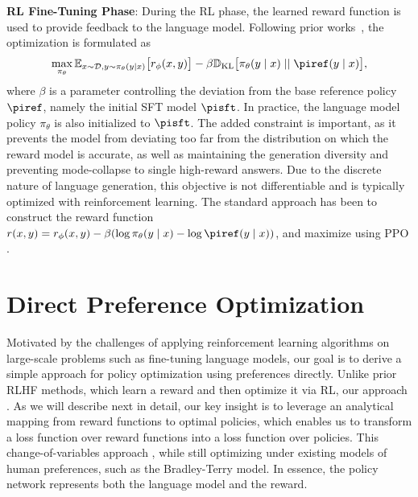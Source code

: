 \textbf{RL Fine-Tuning Phase}: During the RL phase, the learned reward function is used to provide feedback to the language model. Following prior works~\citep{jaques2017sequence, jaques2020human}, the optimization is formulated as
\begin{equation}\label{eq:RL}
\max_{\pi_{\theta}}  \mathbb{E}_{x\sim \mathcal{D}, y\sim \pi_{\theta}(y \mid x)}\bigl[r_{\phi}(x, y)\bigr] - \beta\mathbb{D}_{\textrm{KL}}\bigl[\pi_{\theta}(y\mid x)\mid \mid \piref(y\mid x)\bigr],
\end{equation}
where $\beta$ is a parameter controlling the deviation from the base reference policy $\piref$, namely the initial SFT model $\pisft$. 
In practice, the language model policy $\pi_\theta$ is also initialized to $\pisft$. The added constraint is important, as it prevents the model from deviating too far from the distribution on which the reward model is accurate, as well as maintaining the generation diversity and preventing mode-collapse to single high-reward answers. Due to the discrete nature of language generation, this objective is not differentiable and is typically optimized with reinforcement learning. The standard approach \citep{ziegler2020finetuning, stiennon2022learning, bai2022training, ouyang2022training} has been to construct the reward function ${r(x, y) = r_{\phi}(x, y) -\beta (\log \pi_{\theta}(y\mid x) - \log \piref(y\mid x))}$, and maximize using PPO \cite{schulman2017proximal}. 

\section{Direct Preference Optimization}\label{sec:DPO}

Motivated by the challenges of applying reinforcement learning algorithms on large-scale problems such as fine-tuning language models, our goal is to derive a simple approach for policy optimization using preferences directly. Unlike prior RLHF methods, which learn a reward and then optimize it via RL, our approach . 
As we will describe next in detail, our key insight is to leverage an analytical mapping from reward functions to optimal policies, which enables us to transform a loss function over reward functions into a loss function over policies.
This change-of-variables approach , while still optimizing under existing models of human preferences, such as the Bradley-Terry model. In essence, the policy network represents both the language model and the  reward.

